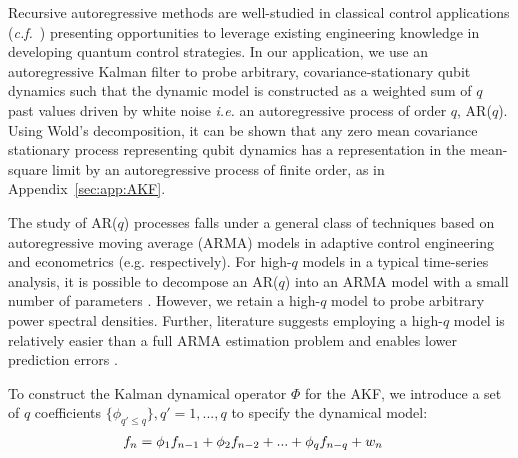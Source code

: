 Recursive autoregressive methods are well-studied in classical control applications  (\emph{c.f.}~\cite{moon2006real}) presenting opportunities to leverage existing engineering knowledge in developing quantum control strategies.  In our application, we use an autoregressive Kalman filter to probe arbitrary, covariance-stationary qubit dynamics such that the dynamic model is constructed as a weighted sum of $q$ past values driven by white noise {\em i.e.} an autoregressive process of order $q$, AR($q$). Using Wold's decomposition, it can be shown that any zero mean covariance stationary process representing qubit dynamics has a representation in the mean-square limit by an autoregressive process of finite order, as in Appendix~\ref{sec:app:AKF}.

The study of AR($q$) processes falls under a general class of techniques based on autoregressive moving average (ARMA) models in adaptive control engineering and econometrics (e.g.  \cite{landau1998adaptive,hamilton1994time} respectively). For high-$q$ models in a typical time-series analysis, it is possible to decompose an AR($q$) into an ARMA model with a small number of parameters \cite{brockwell1996introduction, salzmann1991detection}. However, we retain a high-$q$ model to probe arbitrary power spectral densities. Further, literature suggests employing a high-$q$ model is relatively easier than a full ARMA estimation problem and enables lower prediction errors \cite{wahlberg1989estimation,brockwell1996introduction}. 

To construct the Kalman dynamical operator $\Phi$ for the AKF, we introduce a
set of $q$ coefficients $\{\phi_{q' \leq q}\}, q' = 1, ... , q $ to specify the dynamical model:
\begin{align}
	f_n &= \phi_1 f_{n-1} + \phi_2 f_{n-2} + ... + \phi_q f_{n-q} + w_n \label{eqn:main:ARprocess}
\end{align}

